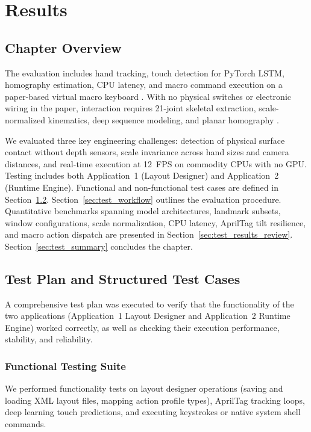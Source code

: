 \chapter{Results}
\label{ch:results}

\section{Chapter Overview}
\label{sec:test_overview}
The evaluation includes hand tracking, touch detection for PyTorch LSTM, homography estimation, CPU latency, and macro command execution on a paper-based virtual macro keyboard \cite{ReviewVirtualKeyboard2020}. With no physical switches or electronic wiring in the paper, interaction requires 21-joint skeletal extraction, scale-normalized kinematics, deep sequence modeling, and planar homography \cite{Zhang2020MediaPipe}.

We evaluated three key engineering challenges: detection of physical surface contact without depth sensors, scale invariance across hand sizes and camera distances, and real-time execution at 12~FPS on commodity CPUs with no GPU. Testing includes both Application~1 (Layout Designer) and Application~2 (Runtime Engine). Functional and non-functional test cases are defined in Section~\ref{sec:test_plan_cases}. Section~\ref{sec:test_workflow} outlines the evaluation procedure. Quantitative benchmarks spanning model architectures, landmark subsets, window configurations, scale normalization, CPU latency, AprilTag tilt resilience, and macro action dispatch are presented in Section~\ref{sec:test_results_review}. Section~\ref{sec:test_summary} concludes the chapter.

\section{Test Plan and Structured Test Cases}
\label{sec:test_plan_cases}
A comprehensive test plan was executed to verify that the functionality of the two applications (Application~1 Layout Designer and Application~2 Runtime Engine) worked correctly, as well as checking their execution performance, stability, and reliability.

\subsection{Functional Testing Suite}
\label{subsec:test_functional}
We performed functionality tests on layout designer operations (saving and loading XML layout files, mapping action profile types), AprilTag tracking loops, deep learning touch predictions, and executing keystrokes or native system shell commands.

